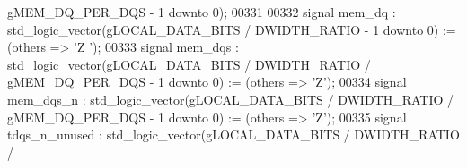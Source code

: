 \begin{DoxyCode}
{      gMEM_DQ_PER_DQS} \textcolor{vhdlchar}{-} \textcolor{vhdllogic}{}\textcolor{vhdllogic}{1} \textcolor{keywordflow}{downto} \textcolor{vhdllogic}{}\textcolor{vhdllogic}{0}\textcolor{vhdlchar}{)};
00331 
00332     \textcolor{keywordflow}{signal} \textcolor{vhdlchar}{mem_dq}         \textcolor{vhdlchar}{:} \textcolor{comment}{std\_logic\_vector}\textcolor{vhdlchar}{(}\textcolor{vhdlchar}{gLOCAL_DATA_BITS} \textcolor{vhdlchar}{/} \textcolor{vhdlchar}{DWIDTH_RATIO} \textcolor{vhdlchar}{-} \textcolor{vhdllogic}{}\textcolor{vhdllogic}{1} \textcolor{keywordflow}{downto} \textcolor{vhdllogic}{}\textcolor{vhdllogic}{0}\textcolor{vhdlchar}{)} \textcolor{vhdlchar}{:=} \textcolor{vhdlchar}{(}\textcolor{keywordflow}{others} \textcolor{vhdlchar}{=}\textcolor{vhdlchar}{>} \textcolor{vhdlchar}{'}\textcolor{vhdlchar}{Z}\textcolor{vhdlchar}{
      '}\textcolor{vhdlchar}{)};
00333     \textcolor{keywordflow}{signal} \textcolor{vhdlchar}{mem_dqs}        \textcolor{vhdlchar}{:} \textcolor{comment}{std\_logic\_vector}\textcolor{vhdlchar}{(}\textcolor{vhdlchar}{gLOCAL_DATA_BITS} \textcolor{vhdlchar}{/} \textcolor{vhdlchar}{DWIDTH_RATIO} \textcolor{vhdlchar}{/} \textcolor{vhdlchar}{
      gMEM_DQ_PER_DQS} \textcolor{vhdlchar}{-} \textcolor{vhdllogic}{}\textcolor{vhdllogic}{1} \textcolor{keywordflow}{downto} \textcolor{vhdllogic}{}\textcolor{vhdllogic}{0}\textcolor{vhdlchar}{)} \textcolor{vhdlchar}{:=} \textcolor{vhdlchar}{(}\textcolor{keywordflow}{others} \textcolor{vhdlchar}{=}\textcolor{vhdlchar}{>} \textcolor{vhdlchar}{'}\textcolor{vhdlchar}{Z}\textcolor{vhdlchar}{'}\textcolor{vhdlchar}{)};
00334     \textcolor{keywordflow}{signal} \textcolor{vhdlchar}{mem_dqs_n}      \textcolor{vhdlchar}{:} \textcolor{comment}{std\_logic\_vector}\textcolor{vhdlchar}{(}\textcolor{vhdlchar}{gLOCAL_DATA_BITS} \textcolor{vhdlchar}{/} \textcolor{vhdlchar}{DWIDTH_RATIO} \textcolor{vhdlchar}{/} \textcolor{vhdlchar}{
      gMEM_DQ_PER_DQS} \textcolor{vhdlchar}{-} \textcolor{vhdllogic}{}\textcolor{vhdllogic}{1} \textcolor{keywordflow}{downto} \textcolor{vhdllogic}{}\textcolor{vhdllogic}{0}\textcolor{vhdlchar}{)} \textcolor{vhdlchar}{:=} \textcolor{vhdlchar}{(}\textcolor{keywordflow}{others} \textcolor{vhdlchar}{=}\textcolor{vhdlchar}{>} \textcolor{vhdlchar}{'}\textcolor{vhdlchar}{Z}\textcolor{vhdlchar}{'}\textcolor{vhdlchar}{)};
00335     \textcolor{keywordflow}{signal} \textcolor{vhdlchar}{tdqs_n_unused}  \textcolor{vhdlchar}{:} \textcolor{comment}{std\_logic\_vector}\textcolor{vhdlchar}{(}\textcolor{vhdlchar}{gLOCAL_DATA_BITS} \textcolor{vhdlchar}{/} \textcolor{vhdlchar}{DWIDTH_RATIO} \textcolor{vhdlchar}{/} \textcolor{vhdlchar}{
}
\end{DoxyCode}
